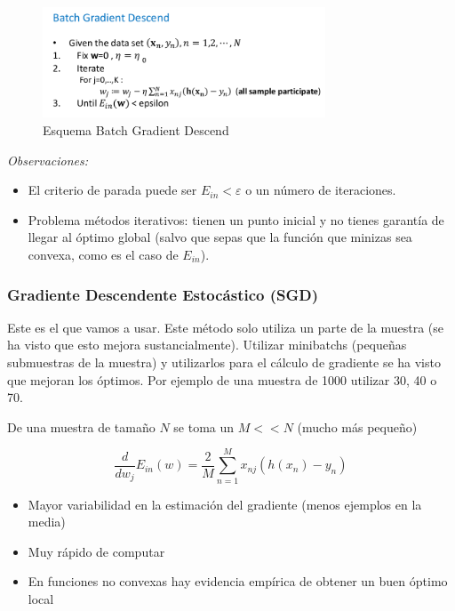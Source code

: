 \documentclass[11pt,a4paper]{article}
\theoremstyle{definition}
\begin{document}
	
		\begin{figure}[htb!]
	\centering
	\includegraphics[width=0.75\textwidth]{images/batch_GD}
	\caption{Esquema Batch Gradient Descend}
	\end{figure}
	
	\textit{Observaciones:}
	\begin{itemize}
	\item	El criterio de parada puede ser $E_{in} < \varepsilon$ o un número de iteraciones.
	\item Problema métodos iterativos: tienen un punto inicial y no tienes garantía de llegar al óptimo global (salvo que sepas que la función que minizas sea convexa, como es el caso de $E_{in}$).
	\end{itemize}
	
	\subsubsection{Gradiente Descendente Estocástico (SGD)}
	Este es el que vamos a usar. Este método solo utiliza un parte de la muestra (se ha visto que esto mejora sustancialmente). Utilizar minibatchs (pequeñas submuestras de la muestra) y utilizarlos para el cálculo de gradiente se ha visto que mejoran los óptimos. Por ejemplo de una muestra de 1000 utilizar 30, 40 o 70. 
	
	De una muestra de tamaño $N$ se toma un $M << N$ (mucho más pequeño)
	
	$$\frac{d}{dw_j}E_{in}(w)=\frac{2}{M}\sum_{n=1}^M x_{nj}(h(x_n)-y_n)$$
	
	\begin{itemize}
		\item Mayor variabilidad en la estimación del gradiente (menos ejemplos en la media)
		\item Muy rápido de computar
		\item En funciones no convexas hay evidencia empírica de obtener un buen óptimo local
	\end{itemize}
\end{document}
